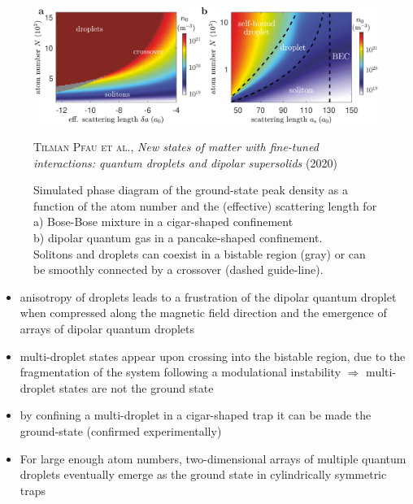 \begin{figure}[H]
    \centering
    \includegraphics[width=1.0\textwidth]{IMAGE/droplet_soliton.png}\\
    \caption{
            Simulated phase diagram of the ground-state peak density as a function
            of the atom number and the (effective) scattering length for \\
            a) Bose-Bose mixture in a cigar-shaped confinement \\
            b) dipolar quantum gas in a pancake-shaped confinement. \\
            Solitons and droplets can coexist in a bistable region (gray) or can be smoothly connected by a crossover (dashed guide-line).
          }
    \textsc{Tilman Pfau et al.}, \emph{New states of matter with fine-tuned interactions: quantum droplets and dipolar supersolids} (2020)
    \label{fig:doplet_collision}
\end{figure}


\begin{itemize}
    \item anisotropy of droplets leads to a frustration of the dipolar quantum droplet when
compressed along the magnetic field direction and the emergence of arrays of dipolar
quantum droplets
    \item multi-droplet states appear upon crossing into the bistable region, due to the fragmentation of the system following a modulational instability $\Rightarrow$ multi-droplet states are not the ground state
    \item by confining a multi-droplet in a cigar-shaped trap it can be made the ground-state (confirmed experimentally)
    \item For large enough atom numbers, two-dimensional arrays of multiple quantum droplets eventually emerge as the ground state in cylindrically symmetric traps
\end{itemize}


